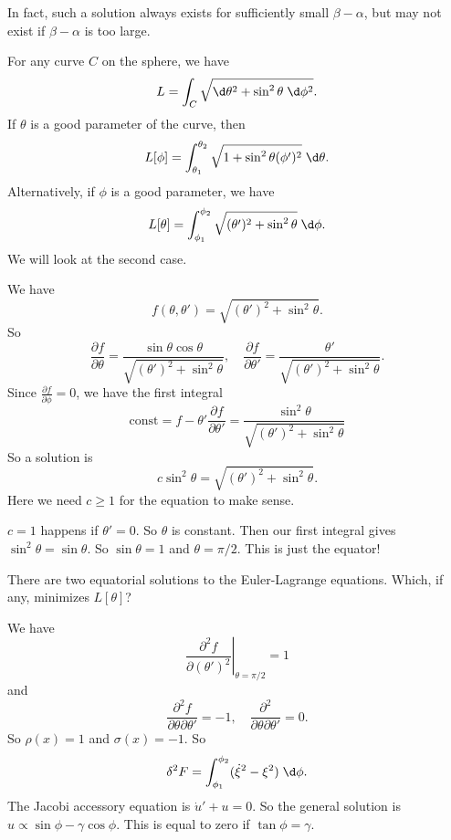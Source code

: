 \documentclass[a4paper]{article}
\begin{document}
In fact, such a solution always exists for sufficiently small $\beta - \alpha$, but may not exist if $\beta - \alpha$ is too large.


\begin{eg}
  For any curve $C$ on the sphere, we have
  \[
    L = \int_C \sqrt{\d \theta^2 + \sin^2 \theta \;\d \phi^2}.
  \]
  If $\theta$ is a good parameter of the curve, then
  \[
    L[\phi] = \int_{\theta _1}^{\theta_2} \sqrt{1 + \sin^2 \theta (\phi')^2}\;\d \theta.
  \]
  Alternatively, if $\phi$ is a good parameter, we have
  \[
    L[\theta] = \int_{\phi_1}^{\phi_2}\sqrt{(\theta')^2 + \sin^2 \theta}\;\d \phi.
  \]
  We will look at the second case.

  We have
  \[
    f(\theta, \theta') = \sqrt{(\theta')^2 + \sin^2 \theta}.
  \]
  So
  \[
    \frac{\partial f}{\partial \theta} = \frac{\sin \theta\cos \theta}{\sqrt{(\theta')^2 + \sin^2 \theta}},\quad \frac{\partial f}{\partial \theta'} = \frac{\theta'}{\sqrt{(\theta')^2 + \sin^2 \theta}}.
  \]
  Since $\frac{\partial f}{\partial \phi} = 0$, we have the first integral
  \[
    \text{const} = f - \theta' \frac{\partial f}{\partial \theta'} = \frac{\sin^2 \theta}{\sqrt{(\theta')^2 + \sin^2 \theta}}
  \]
  So a solution is
  \[
    c\sin^2 \theta = \sqrt{(\theta')^2 + \sin^2 \theta}.
  \]
  Here we need $c \geq 1$ for the equation to make sense.

  $c = 1$ happens if $\theta' = 0$. So $\theta$ is constant. Then our first integral gives $\sin^2 \theta = \sin \theta$. So $\sin \theta = 1$ and $\theta = \pi/2$. This is just the equator!

  There are two equatorial solutions to the Euler-Lagrange equations. Which, if any, minimizes $L[\theta]$?
  \begin{center}
  \end{center}
  We have
  \[
    \left.\frac{\partial^2 f}{\partial (\theta')^2}\right|_{\theta = \pi/2} = 1
  \]
  and
  \[
    \frac{\partial^2 f}{\partial \theta \partial \theta'} = -1,\quad \frac{\partial^2}{\partial \theta\partial \theta'} = 0.
  \]
  So $\rho(x) = 1$ and $\sigma(x) = -1$. So
  \[
    \delta^2 F = \int_{\phi_1}^{\phi_2} (\dot{\xi}^2 - \xi^2)\;\d \phi.
  \]
  The Jacobi accessory equation is $\dot{u}' + u = 0$. So the general solution is $u \propto \sin \phi - \gamma \cos\phi$. This is equal to zero if $\tan \phi = \gamma$.


\end{eg}
\end{document}
